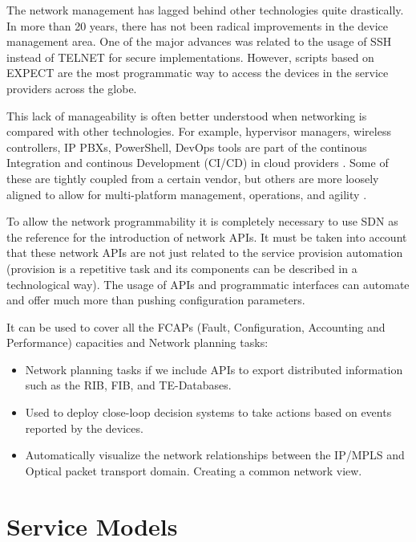 \documentclass[a4paper,fleqn]{cas-dc}
\begin{document}
The network management has lagged behind other technologies quite drastically. In more than 20 years, there has not been radical improvements in the device management area. One of the major advances was related to the usage of SSH instead of TELNET for secure implementations. However, scripts based on EXPECT are the most programmatic way to access the devices in the service providers across the globe.

This lack of manageability is often better understood when networking is compared with other technologies. For example, hypervisor managers, wireless controllers, IP PBXs, PowerShell, DevOps tools are part of the continous Integration and continous Development (CI/CD) in cloud providers \cite{mittal2017cloud,demchenko2016zerotouch}. Some of these are tightly coupled from a certain vendor, but others are more loosely aligned to allow for multi-platform management, operations, and agility \cite{edelman2018network}.

To allow the network programmability it is completely necessary to use SDN as the reference for the introduction of network APIs. It must be taken into account that these network APIs are not just related to the service provision automation (provision is a repetitive task and its components can be described in a technological way). The usage of APIs and programmatic interfaces can automate and offer much more than pushing configuration parameters. 

It can be used to cover all the FCAPs (Fault, Configuration, Accounting and Performance) capacities and Network planning tasks:
\begin{itemize}
    \item Network planning tasks if we include APIs to export distributed information such as the RIB, FIB, and TE-Databases.
    \item Used to deploy close-loop decision systems to take actions based on events reported by the devices.
    \item Automatically visualize the network relationships between the IP/MPLS and Optical packet transport domain. Creating a common network view. 
\end{itemize}

\section{Service Models}
\label{section:models}
\end{document}
